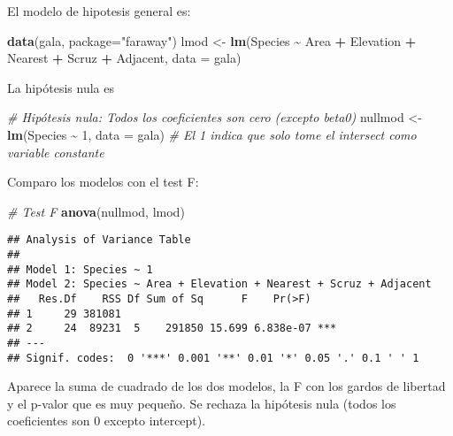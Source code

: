 \documentclass[
]{article}
\newenvironment{Shaded}{\begin{snugshade}}{\end{snugshade}}
\newcommand{\AttributeTok}[1]{\textcolor[rgb]{0.13,0.29,0.53}{#1}}
\newcommand{\CommentTok}[1]{\textcolor[rgb]{0.56,0.35,0.01}{\textit{#1}}}
\newcommand{\DecValTok}[1]{\textcolor[rgb]{0.00,0.00,0.81}{#1}}
\newcommand{\FunctionTok}[1]{\textcolor[rgb]{0.13,0.29,0.53}{\textbf{#1}}}
\newcommand{\NormalTok}[1]{#1}
\newcommand{\OtherTok}[1]{\textcolor[rgb]{0.56,0.35,0.01}{#1}}
\newcommand{\SpecialCharTok}[1]{\textcolor[rgb]{0.81,0.36,0.00}{\textbf{#1}}}
\newcommand{\StringTok}[1]{\textcolor[rgb]{0.31,0.60,0.02}{#1}}
\begin{document}
El modelo de hipotesis general es:

\begin{Shaded}
\begin{Highlighting}[]
\FunctionTok{data}\NormalTok{(gala, }\AttributeTok{package=}\StringTok{"faraway"}\NormalTok{)}
\NormalTok{lmod }\OtherTok{\textless{}{-}} \FunctionTok{lm}\NormalTok{(Species }\SpecialCharTok{\textasciitilde{}}\NormalTok{ Area }\SpecialCharTok{+}\NormalTok{ Elevation }\SpecialCharTok{+}\NormalTok{ Nearest }\SpecialCharTok{+}\NormalTok{ Scruz }\SpecialCharTok{+}\NormalTok{ Adjacent,}
\AttributeTok{data =}\NormalTok{ gala)}
\end{Highlighting}
\end{Shaded}

La hipótesis nula es

\begin{Shaded}
\begin{Highlighting}[]
\CommentTok{\# Hipótesis nula: Todos los coeficientes son cero (excepto beta0)}
\NormalTok{nullmod }\OtherTok{\textless{}{-}} \FunctionTok{lm}\NormalTok{(Species }\SpecialCharTok{\textasciitilde{}} \DecValTok{1}\NormalTok{, }\AttributeTok{data =}\NormalTok{ gala) }\CommentTok{\# El 1 indica que solo tome el intersect como variable constante}
\end{Highlighting}
\end{Shaded}

Comparo los modelos con el test F:

\begin{Shaded}
\begin{Highlighting}[]
\CommentTok{\# Test F}
\FunctionTok{anova}\NormalTok{(nullmod, lmod)}
\end{Highlighting}
\end{Shaded}

\begin{verbatim}
## Analysis of Variance Table
## 
## Model 1: Species ~ 1
## Model 2: Species ~ Area + Elevation + Nearest + Scruz + Adjacent
##   Res.Df    RSS Df Sum of Sq      F    Pr(>F)    
## 1     29 381081                                  
## 2     24  89231  5    291850 15.699 6.838e-07 ***
## ---
## Signif. codes:  0 '***' 0.001 '**' 0.01 '*' 0.05 '.' 0.1 ' ' 1
\end{verbatim}

Aparece la suma de cuadrado de los dos modelos, la F con los gardos de
libertad y el p-valor que es muy pequeño. Se rechaza la hipótesis nula
(todos los coeficientes son 0 excepto intercept).
\end{document}
